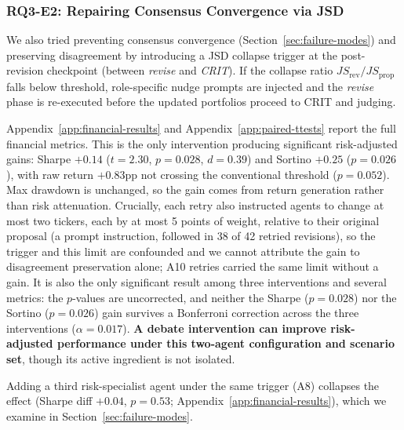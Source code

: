 \documentclass{article}
\begin{document}
\vspace{-0.2cm}
\subsubsection{RQ3-E2: Repairing Consensus Convergence via JSD}
\vspace{-0.2cm}
We also tried preventing consensus convergence (Section~\ref{sec:failure-modes}) and preserving disagreement 
by introducing a JSD collapse trigger at the post-revision checkpoint (between \textit{revise} and \textit{CRIT}). If the collapse ratio $JS_{\text{rev}} / JS_{\text{prop}}$ falls below threshold, role-specific nudge prompts are injected and the \textit{revise} phase is re-executed before the updated portfolios proceed to CRIT and judging. 

Appendix~\ref{app:financial-results} and Appendix~\ref{app:paired-ttests} report the full financial metrics. This is the only intervention producing significant risk-adjusted gains: Sharpe $+0.14$ ($t{=}2.30$, $p{=}0.028$, $d{=}0.39$) and Sortino $+0.25$ ($p{=}0.026$), with raw return $+0.83$pp not crossing the conventional threshold ($p{=}0.052$). Max drawdown is unchanged, so the gain comes from return generation rather than risk attenuation. Crucially, each retry also instructed agents to change at most two tickers, each by at most 5 points of weight, relative to their original proposal (a prompt instruction, followed in 38 of 42 retried revisions), so the trigger and this limit are confounded and we cannot attribute the gain to disagreement preservation alone; A10 retries carried the same limit without a gain. It is also the only significant result among three interventions and several metrics: the $p$-values are uncorrected, and neither the Sharpe ($p{=}0.028$) nor the Sortino ($p{=}0.026$) gain survives a Bonferroni correction across the three interventions ($\alpha{=}0.017$). \textbf{A debate intervention can improve risk-adjusted performance under this two-agent configuration and scenario set}, though its active ingredient is not isolated. 

Adding a third risk-specialist agent under the same trigger (A8) collapses the effect (Sharpe diff $+0.04$, $p=0.53$; Appendix~\ref{app:financial-results}), which we examine in Section~\ref{sec:failure-modes}.

\vspace{-0.2cm}
\end{document}

